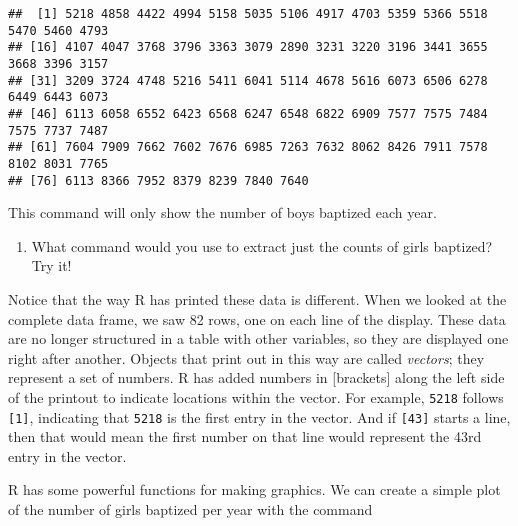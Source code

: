 \documentclass[
]{article}
\newenvironment{Shaded}{\begin{snugshade}}{\end{snugshade}}
\newcommand{\DataTypeTok}[1]{\textcolor[rgb]{0.13,0.29,0.53}{#1}}
\newcommand{\KeywordTok}[1]{\textcolor[rgb]{0.13,0.29,0.53}{\textbf{#1}}}
\newcommand{\NormalTok}[1]{#1}
\newcommand{\OperatorTok}[1]{\textcolor[rgb]{0.81,0.36,0.00}{\textbf{#1}}}
\providecommand{\tightlist}{%
  \setlength{\itemsep}{0pt}\setlength{\parskip}{0pt}}
\begin{document}
\begin{Shaded}
\end{Shaded}

\begin{verbatim}
##  [1] 5218 4858 4422 4994 5158 5035 5106 4917 4703 5359 5366 5518 5470 5460 4793
## [16] 4107 4047 3768 3796 3363 3079 2890 3231 3220 3196 3441 3655 3668 3396 3157
## [31] 3209 3724 4748 5216 5411 6041 5114 4678 5616 6073 6506 6278 6449 6443 6073
## [46] 6113 6058 6552 6423 6568 6247 6548 6822 6909 7577 7575 7484 7575 7737 7487
## [61] 7604 7909 7662 7602 7676 6985 7263 7632 8062 8426 7911 7578 8102 8031 7765
## [76] 6113 8366 7952 8379 8239 7840 7640
\end{verbatim}

This command will only show the number of boys baptized each year.

\begin{enumerate}
\def\labelenumi{\arabic{enumi}.}
\tightlist
\item
  What command would you use to extract just the counts of girls
  baptized? Try it!
\end{enumerate}

Notice that the way R has printed these data is different. When we
looked at the complete data frame, we saw 82 rows, one on each line of
the display. These data are no longer structured in a table with other
variables, so they are displayed one right after another. Objects that
print out in this way are called \emph{vectors}; they represent a set of
numbers. R has added numbers in {[}brackets{]} along the left side of
the printout to indicate locations within the vector. For example,
\texttt{5218} follows \texttt{{[}1{]}}, indicating that \texttt{5218} is
the first entry in the vector. And if \texttt{{[}43{]}} starts a line,
then that would mean the first number on that line would represent the
43rd entry in the vector.

R has some powerful functions for making graphics. We can create a
simple plot of the number of girls baptized per year with the command

\begin{Shaded}
\end{Shaded}
\end{document}
